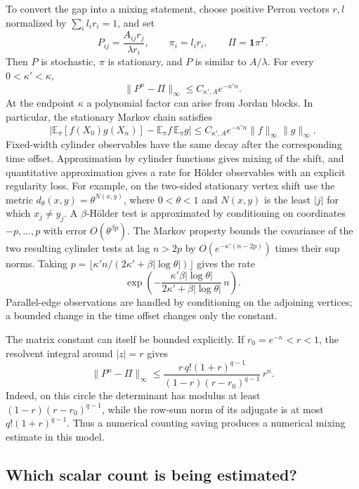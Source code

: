 To convert the gap into a mixing statement, choose positive Perron
vectors $r,l$ normalized by $\sum_i l_ir_i=1$, and set
\[
 P_{ij}=\frac{A_{ij}r_j}{\lambda r_i},
 \qquad \pi_i=l_ir_i,\qquad \Pi=\mathbf1\pi^T.
\]
Then $P$ is stochastic, $\pi$ is stationary, and $P$ is similar to
$A/\lambda$. For every $0<\kappa'<\kappa$,
\begin{equation}
 \|P^n-\Pi\|_\infty\leq C_{\kappa',A}e^{-\kappa'n}.
 \label{eq:countmixparry}
\end{equation}
At the endpoint $\kappa$ a polynomial factor can arise from Jordan
blocks. In particular, the stationary Markov chain satisfies
\[
 \left|\mathbb E_\pi[f(X_0)g(X_n)]
       -\mathbb E_\pi f\,\mathbb E_\pi g\right|
 \leq C_{\kappa',A}e^{-\kappa'n}\|f\|_\infty\|g\|_\infty.
\]
Fixed-width cylinder observables have the same decay after the
corresponding time offset. Approximation by cylinder functions gives
mixing of the shift, and quantitative approximation gives a rate for
H\"older observables with an explicit regularity loss. For example, on
the two-sided stationary vertex shift use the metric $d_\theta(x,y)
=\theta^{N(x,y)}$, where $0<\theta<1$ and $N(x,y)$ is the least
$|j|$ for which $x_j\ne y_j$. A $\beta$-H\"older test is approximated
by conditioning on coordinates $-p,\ldots,p$ with error
$O(\theta^{\beta p})$. The Markov property bounds the covariance of
the two resulting cylinder tests at lag $n>2p$ by
$O(e^{-\kappa'(n-2p)})$ times their sup norms. Taking
$p=\lfloor\kappa'n/(2\kappa'+\beta|\log\theta|)\rfloor$ gives the rate
\[
 \exp\left(-\frac{\kappa'\beta|\log\theta|}
 {2\kappa'+\beta|\log\theta|}\,n\right).
\]
Parallel-edge observations are handled by conditioning on the adjoining
vertices; a bounded change in the time offset changes only the constant.

The matrix constant can itself be bounded explicitly. If
$r_0=e^{-\kappa}<r<1$, the resolvent integral around $|z|=r$ gives
\begin{equation}
 \|P^n-\Pi\|_\infty
 \leq
 \frac{r\,q!(1+r)^{q-1}}
      {(1-r)(r-r_0)^{q-1}}\,r^n.
 \label{eq:countmixmatrixconstant}
\end{equation}
Indeed, on this circle the determinant has modulus at least
$(1-r)(r-r_0)^{q-1}$, while the row-sum norm of its adjugate is
at most $q!(1+r)^{q-1}$. Thus a numerical counting saving produces
a numerical mixing estimate in this model.

\subsection{Which scalar count is being estimated?}
\label{subsec:countmixscalar}

